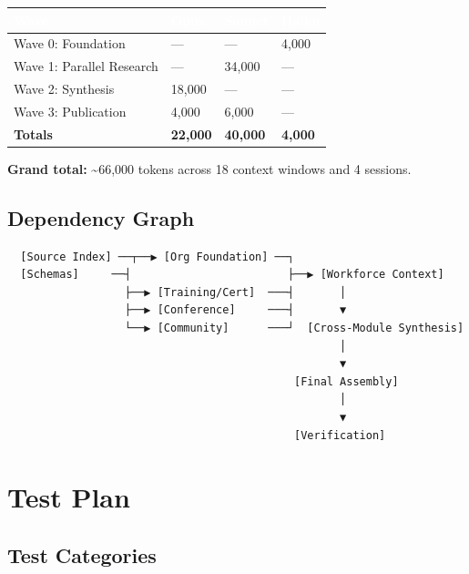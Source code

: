 \documentclass[11pt,letterpaper]{article}
\newcommand{\tableheader}[1]{\textbf{\sffamily\textcolor{white}{#1}}}
\begin{document}
\begin{center}
\begin{tabularx}{\textwidth}{L{4cm}C{2cm}C{2cm}C{2cm}}
\toprule
{}
\tableheader{Wave} & \tableheader{Opus} & \tableheader{Sonnet} & \tableheader{Haiku} \\
\midrule
Wave 0: Foundation & --- & --- & 4,000 \\
Wave 1: Parallel Research & --- & 34,000 & --- \\
Wave 2: Synthesis & 18,000 & --- & --- \\
Wave 3: Publication & 4,000 & 6,000 & --- \\
\midrule
\textbf{Totals} & \textbf{22,000} & \textbf{40,000} & \textbf{4,000} \\
\bottomrule
\end{tabularx}
\end{center}

\textbf{Grand total:} \textasciitilde66,000 tokens across 18 context windows and 4 sessions.

\subsection{Dependency Graph}

\begin{asciibox}
\begin{verbatim}
  [Source Index] ──┬──▶ [Org Foundation] ──┐
  [Schemas]     ──┤                        ├──▶ [Workforce Context]
                  ├──▶ [Training/Cert]  ───┤       │
                  ├──▶ [Conference]     ───┤       ▼
                  └──▶ [Community]      ───┘  [Cross-Module Synthesis]
                                                   │
                                                   ▼
                                            [Final Assembly]
                                                   │
                                                   ▼
                                            [Verification]
\end{verbatim}
\end{asciibox}

\section{Test Plan}

\subsection{Test Categories}
\end{document}
